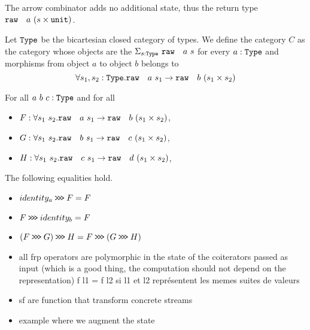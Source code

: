 


The arrow combinator adds no additional state, thus the return type \({\tt{raw}}~\ ~a\ (s \times {\tt{unit}})\).

Let \({\tt{Type}}\) be the bicartesian closed category of types. 
We define the category $C$ as the category whose objects are
the \(\Sigma_{s:{\tt{Type}}}\ {\tt{raw}}~\ ~a\ s\) for every \(a : {\tt{Type}}\)
and morphisms from object \(a\) to object \(b\) belongs to
\begin{equation*}
    \forall s_1,s_2:{\tt{Type}}. {\tt{raw}}~\ ~a\ s_1 \rightarrow {\tt{raw}}~\ ~b\ (s_1 \times s_2)
\end{equation*}

\begin{lemma}
    For all \(a\ b\ c : {\tt{Type}}\) and for all 
    \begin{itemize}
    \item $F : \forall s_1\ s_2. {\tt{raw}}~\ ~a\ s_1 \rightarrow {\tt{raw}}~\ ~b\ (s_1 \times s_2)$,
    \item $G : \forall s_1\ s_2.{\tt{raw}}~\ ~b\ s_1 \rightarrow {\tt{raw}}~\ ~c\ (s_1 \times s_2)$,
    \item $H : \forall s_1\ s_2.{\tt{raw}}~\ ~c\ s_1 \rightarrow {\tt{raw}}~\ ~d\ (s_1 \times s_2)$,
    \end{itemize}
    The following equalities hold.
    \begin{itemize}
    \item \(identity_a \mathbin{\texttt{>\!>\!>}} F = F\) 
    \item \(F \mathbin{\texttt{>\!>\!>}} identity_b = F \) 
    \item \((F \YCompose G) \YCompose H = F \YCompose (G \YCompose H) \) 
    \end{itemize}
\end{lemma}

\begin{itemize}
    \item all frp operators are polymorphic in the state of the coiterators passed as input 
    (which is a good thing, the computation should not depend on the representation)
    f l1 = f l2 si l1 et l2 représentent les memes suites de valeurs
\end{itemize}

\begin{itemize}
    \item sf are function that transform concrete streams 
    \item example where we augment the state
\end{itemize}